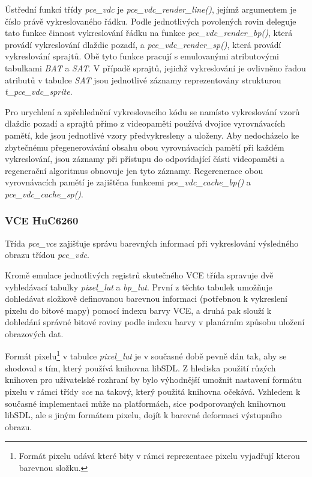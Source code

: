 Ústřední funkcí třídy {\it pce\_vdc} je {\it pce\_vdc\_render\_line()}, jejímž
argumentem je číslo právě vykreslovaného řádku. Podle jednotlivých povolených
rovin deleguje tato funkce činnost vykreslování řádku na funkce {\it
pce\_vdc\_render\_bp()}, která provádí vykreslování dlaždic pozadí, a
{\it pce\_vdc\_render\_sp()}, která provádí vykreslování sprajtů. Obě tyto
funkce pracují s emulovanými atributovými tabulkami {\em BAT} a {\em SAT}. V
případě sprajtů, jejichž vykreslování je ovlivněno řadou atributů v tabulce
{\em SAT} jsou jednotlivé záznamy reprezentovány strukturou {\it
t\_pce\_vdc\_sprite}.

Pro urychlení a zpřehlednění vykreslovacího kódu se namísto vykreslování vzorů
dlaždic pozadí a sprajtů přímo z videopaměti používá dvojice vyrovnávacích
pamětí, kde jsou jednotlivé vzory předvykresleny a uloženy. Aby nedocházelo ke
zbytečnému přegenerovávání obsahu obou vyrovnávacích pamětí při každém
vykreslování, jsou záznamy  při přístupu do odpovídající části
videopaměti a regenerační algoritmus obnovuje jen tyto  záznamy.
Regerenerace obou vyrovnávacích pamětí je zajištěna funkcemi {\it
pce\_vdc\_cache\_bp()} a {\it pce\_vdc\_cache\_sp()}.


\subsubsection{VCE HuC6260}

Třída {\it pce\_vce} zajišťuje správu barevných informací při vykreslování
výsledného obrazu třídou {\it pce\_vdc}.

Kromě emulace jednotlivých registrů skutečného VCE třída spravuje dvě
vyhledávací tabulky {\it pixel\_lut} a {\it bp\_lut}. První z těchto tabulek
umožňuje dohledávat složkově definovanou barevnou informaci (potřebnou k
vykreslení pixelu do bitové mapy) pomocí indexu barvy VCE, a druhá pak slouží k
dohledání správné bitové roviny podle indexu barvy v planárním způsobu uložení
obrazových dat.

Formát pixelu\footnote{Formát pixelu udává které bity v rámci reprezentace
pixelu vyjadřují kterou barevnou složku.} v tabulce {\it pixel\_lut} je v
současné době pevně dán tak, aby se shodoval s tím, který používá knihovna
libSDL. Z hlediska použití růzých knihoven pro uživatelské rozhraní by bylo
výhodnější umožnit nastavení formátu pixelu v rámci třídy {\it vce} na takový,
který použitá knihovna očekává. Vzhledem k současné implementaci může na
platformách, sice podporovaných knihovnou libSDL, ale s jiným formátem pixelu,
dojít k barevné deformaci výstupního obrazu.

